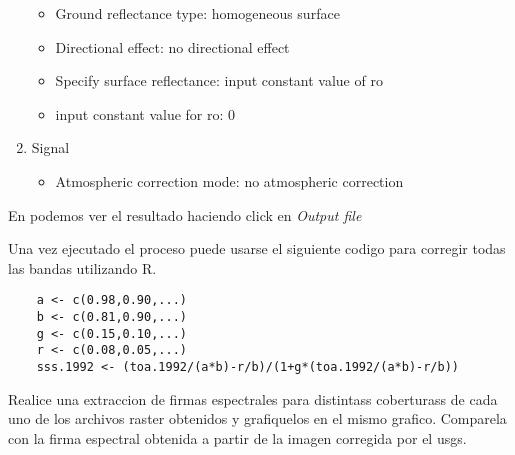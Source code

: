 \begin{enumerate}
        \begin{itemize}
            \item Ground reflectance type: homogeneous surface
            \item Directional effect: no directional effect
            \item Specify surface reflectance: input constant value of ro
            \item input constant value for ro: 0
        \end{itemize}
    \item Signal
        \begin{itemize}
            \item Atmospheric correction mode: no atmospheric correction
        \end{itemize}
\end{enumerate}

En  podemos ver el resultado haciendo click en \emph{Output
file}

Una vez ejecutado el proceso puede usarse el siguiente codigo para corregir
todas las bandas utilizando R.

\begin{lstlisting}
    a <- c(0.98,0.90,...)
    b <- c(0.81,0.90,...)
    g <- c(0.15,0.10,...)
    r <- c(0.08,0.05,...)
    sss.1992 <- (toa.1992/(a*b)-r/b)/(1+g*(toa.1992/(a*b)-r/b))
\end{lstlisting}


\begin{act}
    Realice una extraccion de firmas espectrales para distintass coberturass de
    cada uno de los archivos raster obtenidos y grafiquelos en el mismo grafico.
    Comparela con la firma espectral obtenida a partir de la imagen corregida
    por el usgs.
\end{act}

